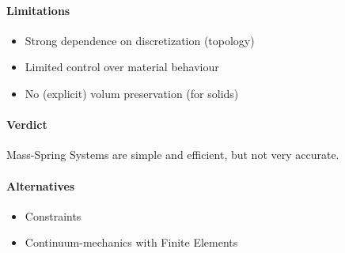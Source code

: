 \begin{multicols}{2}
\paragraph{Limitations}
\begin{itemize}
	\item Strong dependence on discretization (topology)
	\item Limited control over material behaviour
	\item No (explicit) volum preservation (for solids)
\end{itemize}

\paragraph{Verdict} Mass-Spring Systems are simple and efficient, but not very accurate.
\paragraph{Alternatives}
\begin{itemize}
	\item Constraints
	\item Continuum-mechanics with Finite Elements
\end{itemize}



\end{multicols}
